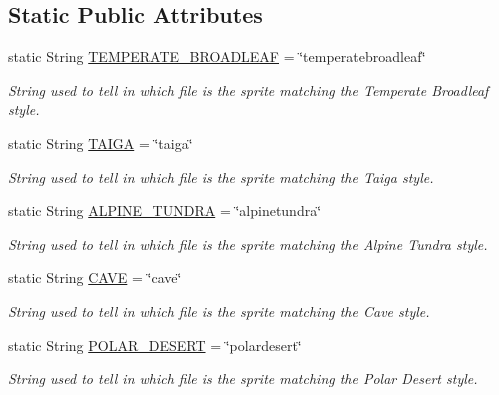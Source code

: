 \subsection*{Static Public Attributes}
\begin{DoxyCompactItemize}
\item 
static String \hyperlink{a00030_a9e9253b684231327dd6ddeca5768033e}{T\-E\-M\-P\-E\-R\-A\-T\-E\-\_\-\-B\-R\-O\-A\-D\-L\-E\-A\-F} = \char`\"{}temperatebroadleaf\char`\"{}
\begin{DoxyCompactList}\small\item\em String used to tell in which file is the sprite matching the Temperate Broadleaf style. \end{DoxyCompactList}\item 
static String \hyperlink{a00028_ad3418d8f4936efb0ef1e3eb2009a34f0}{T\-A\-I\-G\-A} = \char`\"{}taiga\char`\"{}
\begin{DoxyCompactList}\small\item\em String used to tell in which file is the sprite matching the Taiga style. \end{DoxyCompactList}\item 
static String \hyperlink{a00002_ad3c9b18e312ff348661fc1a42f28f7b6}{A\-L\-P\-I\-N\-E\-\_\-\-T\-U\-N\-D\-R\-A} = \char`\"{}alpinetundra\char`\"{}
\begin{DoxyCompactList}\small\item\em String used to tell in which file is the sprite matching the Alpine Tundra style. \end{DoxyCompactList}\item 
static String \hyperlink{a00004_abbad3655c1d1f230dddfd7ecc5194f50}{C\-A\-V\-E} = \char`\"{}cave\char`\"{}
\begin{DoxyCompactList}\small\item\em String used to tell in which file is the sprite matching the Cave style. \end{DoxyCompactList}\item 
static String \hyperlink{a00019_a48dd1801e0146ea2306dadcbdee81b77}{P\-O\-L\-A\-R\-\_\-\-D\-E\-S\-E\-R\-T} = \char`\"{}polardesert\char`\"{}
\begin{DoxyCompactList}\small\item\em String used to tell in which file is the sprite matching the Polar Desert style. \end{DoxyCompactList}\end{DoxyCompactItemize}
